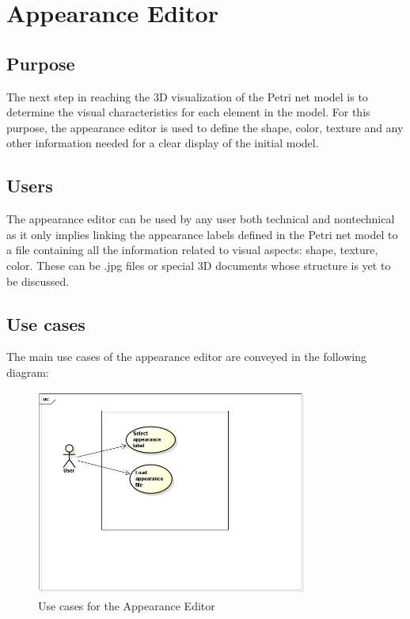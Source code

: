 \section{Appearance Editor}
\subsection{Purpose}
The next step in reaching the 3D visualization of the Petri net model is to determine the visual characteristics for each element in the model. For this purpose, the appearance editor is used to define the shape, color, texture and any other information needed for a clear display of the initial model. 
\subsection{Users}
	The appearance editor can be used by any user both technical and nontechnical as it only implies linking the appearance labels defined in the Petri net model to a file containing all the information related to visual aspects: shape, texture, color. These can be .jpg files or special 3D documents whose structure is yet to be discussed.

\subsection{Use cases}
	The main use cases of the appearance editor are conveyed in the following diagram: 
	
	\begin{figure}[htp]
\begin{center}
  \includegraphics[width=0.8\textwidth]{image/AppearanceUC.png}
  \caption{Use cases for the Appearance Editor}
  \label{fig:appearance_editor_usecases}
\end{center}
\end{figure}


